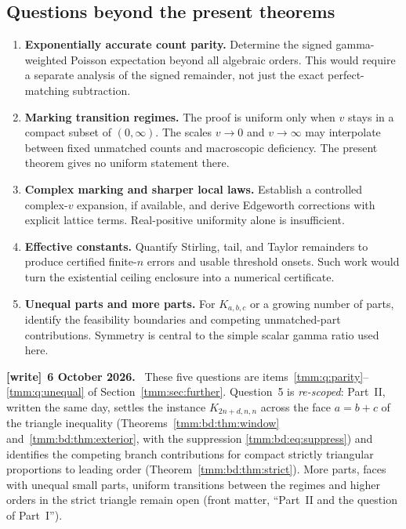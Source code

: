 \documentclass[11pt,letterpaper]{article}
\theoremstyle{remark}\newtheorem{remark}[theorem]{Remark}
\newenvironment{writenote}[1][]{\par\smallskip\begingroup\small
 \noindent\textbf{[write]}\if\relax\detokenize{#1}\relax\else~\textbf{#1.}\fi\ }%
 {\par\endgroup\smallskip}
\begin{document}
\subsection{Questions beyond the present theorems}\label{tmm:bal:sec:questions}
\begin{enumerate}
\item \textbf{Exponentially accurate count parity.} Determine the signed gamma-weighted Poisson expectation beyond all algebraic orders. This would require a separate analysis of the signed remainder, not just the exact perfect-matching subtraction.
\item \textbf{Marking transition regimes.} The proof is uniform only when $v$ stays in a compact subset of $(0,\infty)$. The scales $v\to0$ and $v\to\infty$ may interpolate between fixed unmatched counts and macroscopic deficiency. The present theorem gives no uniform statement there.
\item \textbf{Complex marking and sharper local laws.} Establish a controlled complex-$v$ expansion, if available, and derive Edgeworth corrections with explicit lattice terms. Real-positive uniformity alone is insufficient.
\item \textbf{Effective constants.} Quantify Stirling, tail, and Taylor remainders to produce certified finite-$n$ errors and usable threshold onsets. Such work would turn the existential ceiling enclosure into a numerical certificate.
\item \textbf{Unequal parts and more parts.} For $K_{a,b,c}$ or a growing number of parts, identify the feasibility boundaries and competing unmatched-part contributions. Symmetry is central to the simple scalar gamma ratio used here.
\end{enumerate}
\begin{writenote}[6 October 2026]
These five questions are items~\ref{tmm:q:parity}--\ref{tmm:q:unequal} of Section~\ref{tmm:sec:further}. Question~5 is \emph{re-scoped}: Part~II, written the same day, settles the instance $K_{2n+d,n,n}$ across the face $a=b+c$ of the triangle inequality (Theorems~\ref{tmm:bd:thm:window} and~\ref{tmm:bd:thm:exterior}, with the suppression \eqref{tmm:bd:eq:suppress}) and identifies the competing branch contributions for compact strictly triangular proportions to leading order (Theorem~\ref{tmm:bd:thm:strict}). More parts, faces with unequal small parts, uniform transitions between the regimes and higher orders in the strict triangle remain open (front matter, ``Part~II and the question of Part~I'').
\end{writenote}
\end{document}

